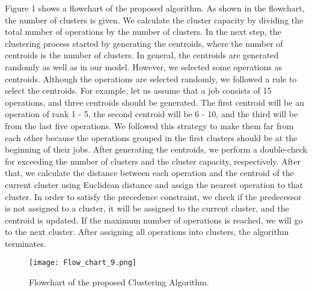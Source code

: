 \documentclass{article}
\begin{document}
Figure 1 shows a flowchart of the proposed algorithm. As shown in the flowchart, the number of clusters is given. We calculate the cluster capacity by dividing the total number of operations by the number of clusters. In the next step, the clustering process started by generating the centroids, where the number of centroids is the number of clusters. In general, the centroids are generated randomly as well as in our model. However, we selected some operations as centroids. Although the operations are selected randomly, we followed a rule to select the centroids. For example, let us assume that a job consists of 15 operations, and three centroids should be generated. The first centroid will be an operation of rank 1 - 5, the second centroid will be 6 - 10, and the third will be from the last five operations. We followed this strategy to make them far from each other because the operations grouped in the first clusters should be at the beginning of their jobs. After generating the centroids, we perform a double-check for exceeding the number of clusters and the cluster capacity, respectively. After that, we calculate the distance between each operation and the centroid of the current cluster using Euclidean distance and assign the nearest operation to that cluster. In order to satisfy the precedence constraint, we check if the predecessor is not assigned to a cluster, it will be assigned to the current cluster, and the centroid is updated. If the maximum number of operations is reached, we will go to the next cluster. After assigning all operations into clusters, the algorithm terminates.

\begin{figure}[h!]
  \texttt{[image: Flow\_chart\_9.png]}
  \caption{Flowchart of the proposed Clustering Algorithm.}
  \label{fig:Flowchart of the proposed Clustering Algorithm}
\end{figure}
\end{document}
